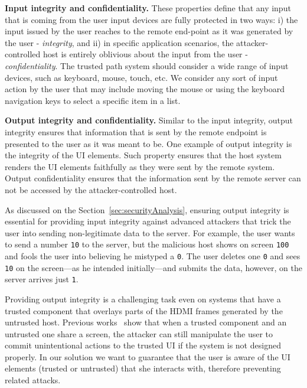 \begin{mylist}
  \item \textbf{Input integrity and confidentiality.} These properties define that any input that is coming from the user input devices are fully protected in two ways: i) the input issued by the user reaches to the remote end-point as it was generated by the user - \emph{integrity}, and ii) in specific application scenarios, the attacker-controlled host is entirely oblivious about the input from the user - \emph{confidentiality}. The trusted path system should consider a wide range of input devices, such as keyboard, mouse, touch, etc. We consider any sort of input action by the user that may include moving the mouse or using the keyboard navigation keys to select a specific item in a list.
  
  
  \item \textbf{Output integrity and confidentiality.} Similar to the input integrity, output integrity ensures that information that is sent by the remote endpoint is presented to the user as it was meant to be. One example of output integrity is the integrity of the UI elements. Such property ensures that the host system renders the UI elements faithfully as they were sent by the remote system. Output confidentiality ensures that the information sent by the remote server can not be accessed by the attacker-controlled host. 
  

  As discussed on the Section~\ref{sec:securityAnalysis}, ensuring output integrity is essential for providing input integrity against advanced attackers that trick the user into sending non-legitimate data to the server. For example, the user wants to send a number \texttt{10} to the server, but the malicious host shows on screen \texttt{100} and fools the user into believing he mistyped a \texttt{0}. The user deletes one \texttt{0} and sees \texttt{10} on the screen---as he intended initially---and submits the data, however, on the server arrives just \texttt{1}. 
  
  Providing output integrity is a challenging task even on systems that have a trusted component that overlays parts of the HDMI frames generated by the untrusted host. Previous works~\cite{huang2012clickjacking} show that when a trusted component and an untrusted one share a screen, the attacker can still manipulate the user to commit unintentional actions to the trusted UI if the system is not designed properly. In our solution we want to guarantee that the user is aware of the UI elements (trusted or untrusted) that she interacts with, therefore preventing related attacks.
  \end{mylist}

